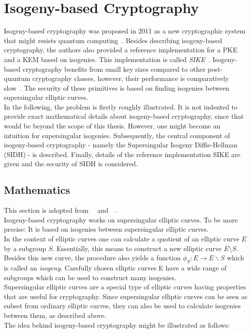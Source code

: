 \section{Isogeny-based Cryptography} \label{sec:isogeny-based_crypto}
Isogeny-based cryptography was proposed in 2011 as a new cryptographic system that might resists quantum computing~\parencite{jao2011towards}. Besides describing isogeny-based cryptography, the authors also provided a reference implementation for a \gls{PKE} and a \gls{KEM} based on isogenies. This implementation is called \textit{\gls{SIKE}}~\parencite{sike2020spec}. Isogeny-based cryptography benefits from small key sizes compared to other post-quantum cryptography classes, however, their performance is comparatively slow~\parencite{sike2020spec}. The security of these primitives is based on finding isogenies between supersingular elliptic curves.\\
In the following, the problem is firstly roughly illustrated. It is not indented to provide exact mathematical details about isogeny-based cryptography, since that would be beyond the scope of this thesis. However, one might become an intuition for supersingular isogenies. Subsequently, the central component of isogeny-based cryptography - namely the Supersingular Isogeny Diffie-Hellman (\gls{SIDH}) - is described. Finally, details of the reference implementation \gls{SIKE} are given and the security of \gls{SIDH} is considered.

\subsection{Mathematics}
This section is adopted from~~\parencite{urbanik2017friendly} and~~\parencite{costello2019supersingular}.\\
Isogeny-based cryptography works on supersingular elliptic curves. To be more precise: It is based on isogenies between supersingular elliptic curves.
\\
In the context of elliptic curves one can calculate a quotient of an elliptic curve $E$ by a subgroup $S$. Essentially, this means to construct a new elliptic curve $E$\textbackslash $S$.
Besides this new curve, the procedure also yields a function $\phi_S: E \to E \backslash S$ which is called an \textit{isogeny}. Carefully chosen elliptic curves E have a wide range of subgroups which can be used to construct many isogenies.
\\
Supersingular elliptic curves are a special type of elliptic curves having properties that are useful for cryptography. Since supersingular elliptic curves can be seen as subset from ordinary elliptic curves, they can also be used to calculate isogenies between them, as described above.
\\
The idea behind isogeny-based cryptography might be illustrated as follows:

